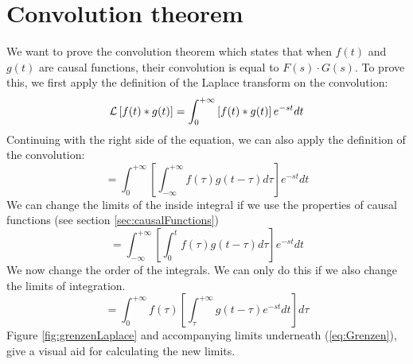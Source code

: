 \documentclass[]{subfiles}
\begin{document}
	\section{Convolution theorem}
	We want to prove the convolution theorem which states that when $f(t)$ and $g(t)$ are causal functions, their convolution is equal to $F(s)\cdot G(s)$. To prove this, we first apply the definition of the Laplace transform on the convolution:
	\begin{equation*}
		\mathcal{L}\left[ f(t)\ast g(t)\right]  = \int_{0}^{+\infty}\left[ f(t)\ast g(t)\right] e^{-st}dt
	\end{equation*}
	Continuing with the right side of the equation, we can also apply the definition of the convolution:
	\begin{equation*}
		=\int_{0}^{+\infty}\left[ \int_{-\infty}^{+\infty}f(\tau)g(t-\tau)d\tau	\right] e^{-st}dt
	\end{equation*}
	We can change the limits of the inside integral if we use the properties of causal functions (see section \ref{sec:causalFunctions})
	\begin{equation*}
		=\int_{-\infty}^{+\infty}\left[ \int_{0}^{t}f(\tau)g(t-\tau)d\tau\right] e^{-st}dt
	\end{equation*}
	We now change the order of the integrals. We can only do this if we also change the limits of integration.
	\begin{equation*}
		=\int_{0}^{+\infty}f(\tau)\left[ \int_{\tau}^{+\infty}g(t-\tau)e^{-st}dt\right] d\tau
	\end{equation*}
	Figure \ref{fig:grenzenLaplace} and accompanying limits underneath (\ref{eq:Grenzen}), give a visual aid for calculating the new limits.
\end{document}
